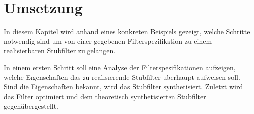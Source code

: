 \section{Umsetzung}
In diesem Kapitel wird anhand eines konkreten Beispiels gezeigt, welche Schritte notwendig sind um von einer gegebenen Filterspezifikation zu einem realisierbaren Stubfilter zu gelangen.

In einem ersten Schritt soll eine Analyse der Filterspezifikationen aufzeigen, welche Eigenschaften das zu realisierende Stubfilter überhaupt aufweisen soll. Sind die Eigenschaften bekannt, wird das Stubfilter synthetisiert. Zuletzt wird das Filter optimiert und dem theoretisch synthetisierten Stubfilter gegenübergestellt.  






